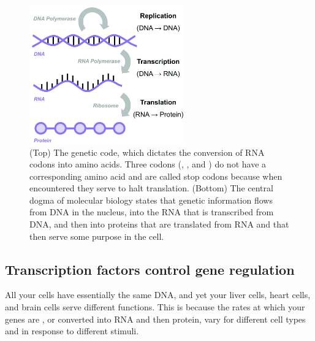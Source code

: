\begin{figure}[hp]
\vspace{8ex}

\includegraphics[width = 0.6\textwidth]{../images_CMYK/central_dogma}
\caption{(Top) The genetic code, which dictates the conversion of RNA codons into amino acids. Three codons (, , and ) do not have a corresponding amino acid and are called stop codons because when encountered they serve to halt translation. (Bottom) The central dogma of molecular biology states that genetic information flows from DNA in the nucleus, into the RNA that is transcribed from DNA, and then into proteins that are translated from RNA and that then serve some purpose in the cell.}
\label{fig:central_dogma}
\end{figure}


\subsection{Transcription factors control gene regulation}

All your cells have essentially the same DNA, and yet your liver cells, heart cells, and brain cells serve different functions. This is because the rates at which your genes are , or converted into RNA and then protein, vary for different cell types and in response to different stimuli.

